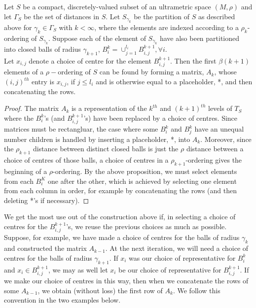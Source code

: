 \begin{proposition}
Let $S$ be a compact, discretely-valued subset of an ultrametric space $(M, \rho)$ and let $\Gamma_S$ be the set of distances in $S$. Let $S_{\gamma_k}$ be the partition of $S$ as described above for $\gamma_k \in \Gamma_S$ with $k < \infty$, where the elements are indexed according to a $\rho_k$-ordering of $S_{\gamma_k}$. Suppose each of the element of $S_{\gamma_k}$ have also been partitioned into closed balls of radius $\gamma_{k+1}$, $B^k_i =\cup_{j=1}^{l_i} B^{k+1}_{i,j}, \forall i$.\\

Let $x_{i,j}$ denote a choice of centre for the element $B^{k+1}_{i,j}$. Then the first $\beta(k+1)$ elements of a $\rho-$ordering of $S$ can be found by forming a matrix, $A_k$, whose $(i,j)^{th}$ entry is $x_{i,j}$, if $j \leq l_i$ and is otherwise equal to a placeholder, *, and then concatenating the rows.
\end{proposition}


\begin{proof}
The matrix $A_k$ is a representation of the $k^{th}$ and $(k+1)^{th}$ levels of $T_S$ where the $B^k_i$'s (and $B^{k+1}_{i,j}$'s) have been replaced by a choice of centres. Since matrices must be rectangluar, the case where some $B^k_i$ and $B^k_j$ have an unequal number children is handled by inserting a placeholder, *, into $A_k$.  Moreover, since the $\rho_{k+1}$ distance between distinct closed balls is just the $\rho$ distance between a choice of centres of those  balls, a choice of centres in a $\rho_{k+1}$-ordering gives the beginning of a $\rho$-ordering.  By the above proposition, we must select elements from each $B^K_i$ one after the other, which is achieved by selecting one element from each column in order, for example by concatenating the rows (and then deleting *'s if necessary). 
\end{proof}

We get the most use out of the construction above if, in selecting a choice of centres for the $B^{k+1}_{i,j}$'s, we reuse the previous choices as much as possible. Suppose, for example, we have made a choice of centres for the balls of radius $\gamma_k$ and constructed the matrix $A_{k-1}$. At the next iteration, we will need a choice of centres for the balls of radius $\gamma_{k+1}$. If $x_i$ was our choice of representative for $B^k_i$ and $x_i \in B^{k+1}_{i,j}$, we may as well let $x_i$ be our choice of representative for $B^{k+1}_{i,j}$. If we make our choice of centres in this way, then when we concatenate the rows of some $A_{k-1}$, we obtain (without loss) the first row of $A_k$. We follow this convention in the two examples below.\\

